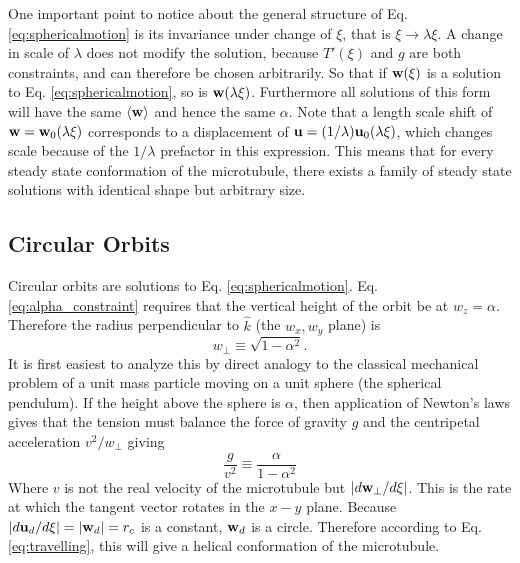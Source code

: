 \documentclass[11pt]{ucthesis}
\def\bu{{\bf u}}
\def\bw{{\bf w}}
\begin{document}
One important point to notice about the general structure of Eq. \ref{eq:sphericalmotion} is its invariance under
change of $\xi$, that is $\xi \rightarrow \lambda \xi$. A change in scale of $\lambda$ does not modify the
solution, because $T'(\xi)$  and $g$ are both constraints, and can therefore be chosen arbitrarily. So that if
$\bw(\xi)$ is a solution to Eq. \ref{eq:sphericalmotion}, so is $\bw(\lambda \xi)$. Furthermore all solutions
of this form will have the same $\langle \bw \rangle$ and hence the same $\alpha$. Note that a length scale
shift of $\bw = \bw_0(\lambda \xi)$ corresponds to a displacement of $\bu = (1/\lambda)\bu_0(\lambda \xi)$, which
changes scale because of the $1/\lambda$ prefactor in this expression. This means that for every
steady state conformation of the microtubule, there exists a family of steady state solutions with identical
shape but arbitrary size.

\subsection{Circular Orbits}
\label{subsec:CircularOrbits}

Circular orbits are solutions to Eq. \ref{eq:sphericalmotion}. Eq. \ref{eq:alpha_constraint} requires that the vertical
height of the orbit be at $w_z = \alpha$. Therefore the radius perpendicular to $\hat k$ (the $w_x, w_y$ plane) is 
\begin{equation}
\label{eq:w_perp_alpha}
w_\perp \equiv \sqrt{1-\alpha^2}. 
\end{equation}
It is first easiest to analyze this by direct analogy to the classical mechanical problem of a unit mass particle moving on a unit sphere (the
spherical pendulum).
If the height above the sphere is $\alpha$, then application of Newton's laws gives that the tension must balance the force
of gravity $g$ and the centripetal acceleration $v^2/w_\perp$ giving
\begin{equation}
\frac{g}{v^2} \equiv \frac{\alpha}{1-\alpha^2} 
\end{equation}
Where $v$ is not the real velocity of the microtubule but $|d \bw_\perp/d\xi|$. This is the rate at which the
tangent vector rotates in the $x-y$ plane. 
Because $|d\bu_d/d\xi|  = |\bw_d| = r_c$ is a constant, $\bw_d$ is a circle. 
Therefore according to Eq. \ref{eq:travelling}, this will give a helical conformation of the microtubule. 
\end{document}
